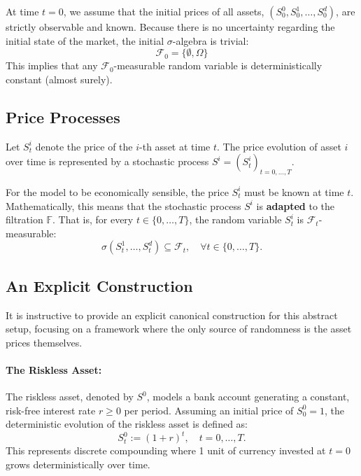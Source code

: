 \begin{remark}
At time $t=0$, we assume that the initial prices of all assets, $(S_0^0, S_0^1, \dots, S_0^d)$, are strictly observable and known. Because there is no uncertainty regarding the initial state of the market, the initial $\sigma$-algebra is trivial:
$$
\mathcal{F}_0 = \{\emptyset, \Omega\}
$$
This implies that any $\mathcal{F}_0$-measurable random variable is deterministically constant (almost surely).
\end{remark}

\subsection{Price Processes}

Let $S_t^i$ denote the price of the $i$-th asset at time $t$. The price evolution of asset $i$ over time is represented by a stochastic process $S^i = (S_t^i)_{t=0, \dots, T}$.

For the model to be economically sensible, the price $S_t^i$ must be known at time $t$. Mathematically, this means that the stochastic process $S^i$ is \textbf{adapted} to the filtration $\mathbb{F}$. That is, for every $t \in \{0, \dots, T\}$, the random variable $S_t^i$ is $\mathcal{F}_t$-measurable:
$$
\sigma\left(S_t^1, \dots, S_t^d\right) \subseteq \mathcal{F}_t, \quad \forall t \in \{0, \dots, T\}.
$$

\subsection{An Explicit Construction}

It is instructive to provide an explicit canonical construction for this abstract setup, focusing on a framework where the only source of randomness is the asset prices themselves.

\paragraph{The Riskless Asset:}
The riskless asset, denoted by $S^0$, models a bank account generating a constant, risk-free interest rate $r \geq 0$ per period. Assuming an initial price of $S_0^0 = 1$, the deterministic evolution of the riskless asset is defined as:
$$
S_t^0 := (1+r)^t, \quad t=0, \dots, T.
$$
This represents discrete compounding where 1 unit of currency invested at $t=0$ grows deterministically over time.

